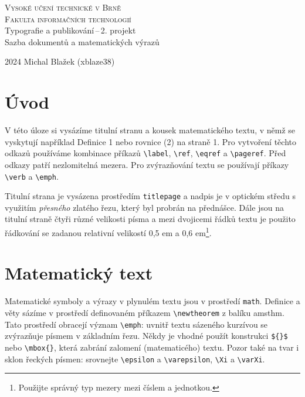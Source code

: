 \documentclass[a4paper, twocolumn, 11pt]{article}
\begin{document}
\begin{titlepage}
\begin{center}
    \Huge
    \textsc{Vysoké učení technické v Brně\\
    \huge{Fakulta informačních technologií}}\\
    \Large{Typografie a publikování\,--\,2. projekt\\
    Sazba dokumentů a matematických výrazů}\\
\end{center}
{\Large 2024 \hfill Michal Blažek (xblaze38)}
\end{titlepage}

\section*{Úvod}

V této úloze si vysázíme titulní stranu a kousek matematického textu, v němž se vyskytují například Definice 1 nebo rovnice (2) na straně 1. Pro vytvoření těchto odkazů používáme kombinace příkazů \verb|\label|, \verb|\ref|, \verb|\eqref| a \verb|\pageref|. Před odkazy patří nezlomitelná mezera. Pro zvýrazňování textu se používají příkazy \verb|\verb| a \verb|\emph|.

Titulní strana je vysázena prostředím \texttt{titlepage} a nadpis je v optickém středu s využitím \emph{přesného} zlatého řezu, který byl probrán na přednášce. Dále jsou na titulní straně čtyři různé velikosti písma a mezi dvojicemi řádků textu je použito řádkování se zadanou relativní velikostí 0,5 em a 0,6 em\footnote{Použijte správný typ mezery mezi číslem a jednotkou.}.

\section{Matematický text}

Matematické symboly a výrazy v plynulém textu jsou v prostředí \texttt{math}. Definice a věty sázíme v prostředí definovaném příkazem \verb|\newtheorem| z balíku amsthm. Tato prostředí obracejí význam \verb|\emph|: uvnitř textu sázeného kurzívou se zvýrazňuje písmem v základním řezu. Někdy je vhodné použít konstrukci \verb|${}$| nebo \verb|\mbox{}|, která zabrání zalomení (matematicého) textu. Pozor také na tvar i sklon řeckých písmen: srovnejte \verb|\epsilon| a \verb|\varepsilon|, \verb|\Xi| a \verb|\varXi|.
\end{document}
